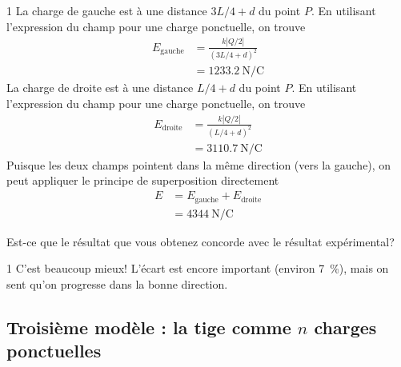 \documentclass{tufte-handout}
\newcommand{\abs}[1]{\left| #1 \right|}
\def\reponse{1}
\begin{document}
\if\reponse1
  {\color{tblue}
  La charge de gauche est à une distance $3L/4 + d$ du point $P$. En utilisant
  l'expression du champ pour une charge ponctuelle, on trouve
  \begin{align*}
    E_\mathrm{gauche} &= \frac{k\abs{Q/2}}{\left(3L/4 + d\right)^2}  \\
      &= \SI{1233.2}{\newton\per\coulomb}
  \end{align*}
  La charge de droite est à une distance $L/4 + d$ du point $P$. En utilisant
  l'expression du champ pour une charge ponctuelle, on trouve
  \begin{align*}
    E_\mathrm{droite} &= \frac{k\abs{Q/2}}{\left(L/4 + d\right)^2}  \\
      &= \SI{3110.7}{\newton\per\coulomb}
  \end{align*}
  Puisque les deux champs pointent dans la même direction (vers la gauche), on
  peut appliquer le principe de superposition directement
  \begin{align*}
    E &= E_\mathrm{gauche} + E_\mathrm{droite}  \\
      &= \SI{4344}{\newton\per\coulomb}
  \end{align*}
  }
\else
  \vspace{10cm}
\fi

Est-ce que le résultat que vous obtenez concorde avec le résultat expérimental?

\if\reponse1
  {\color{tblue}
  C'est beaucoup mieux! L'écart est encore important (environ
  \SI{7}{\percent}), mais on sent qu'on progresse dans la bonne direction.
  }
\else
\vspace{5cm}
\fi




\subsection{Troisième modèle : la tige comme $n$ charges ponctuelles}
\end{document}
